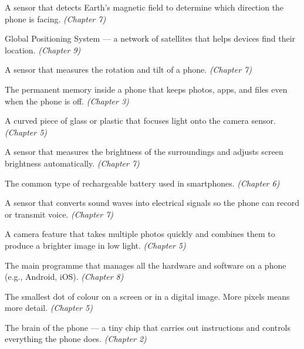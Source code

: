 \begin{tcolorbox}
\begin{description}[labelwidth=4cm, leftmargin=4.2cm, style=nextline, itemsep=0.45\baselineskip]
\item[\glossterm{Compass}]
A sensor that detects Earth's magnetic field to determine which direction the phone is facing.
\emph{(Chapter 7)}

\item[\glossterm{GPS}]
Global Positioning System — a network of satellites that helps devices find their location.
\emph{(Chapter 9)}

\item[\glossterm{Gyroscope}]
A sensor that measures the rotation and tilt of a phone.
\emph{(Chapter 7)}

\item[\glossterm{Internal storage}]
The permanent memory inside a phone that keeps photos, apps, and files even when the phone is off.
\emph{(Chapter 3)}

\item[\glossterm{Lens}]
A curved piece of glass or plastic that focuses light onto the camera sensor.
\emph{(Chapter 5)}

\item[\glossterm{Light sensor}]
A sensor that measures the brightness of the surroundings and adjusts screen brightness automatically.
\emph{(Chapter 7)}

\item[\glossterm{Lithium-ion battery}]
The common type of rechargeable battery used in smartphones.
\emph{(Chapter 6)}

\item[\glossterm{Microphone}]
A sensor that converts sound waves into electrical signals so the phone can record or transmit voice.
\emph{(Chapter 7)}

\item[\glossterm{Night mode}]
A camera feature that takes multiple photos quickly and combines them to produce a brighter image in low light.
\emph{(Chapter 5)}

\item[\glossterm{Operating system}]
The main programme that manages all the hardware and software on a phone (e.g., Android, iOS).
\emph{(Chapter 8)}

\item[\glossterm{Pixel}]
The smallest dot of colour on a screen or in a digital image. More pixels means more detail.
\emph{(Chapter 5)}

\item[\glossterm{Processor}]
The brain of the phone — a tiny chip that carries out instructions and controls everything the phone does.
\emph{(Chapter 2)}


\end{description}
\end{tcolorbox}
